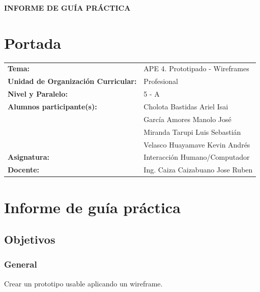\documentclass{article}
\begin{document}
\begin{center}
    {\large \textbf{INFORME DE GUÍA PRÁCTICA}} \\
\end{center}

\section{Portada}
\begin{flushleft}
\begin{tabular}{ l p{9cm} }
    \textbf{Tema:} & APE 4. Prototipado - Wireframes \\
    \textbf{Unidad de Organización Curricular:} & Profesional \\
    \textbf{Nivel y Paralelo:} & 5 - A \\
    \textbf{Alumnos participante(s):} & Cholota Bastidas Ariel Isai \\
                                      & García Amores Manolo José \\
                                      & Miranda Tarupi Luis Sebastián \\
                                      & Velasco Huayamave Kevin Andrés \\
    \textbf{Asignatura:} & Interacción Humano/Computador \\
    \textbf{Docente:} & Ing. Caiza Caizabuano Jose Ruben \\
\end{tabular}
\end{flushleft}

\section{Informe de guía práctica}

\subsection{Objetivos}
\subsubsection{General}
Crear un prototipo usable aplicando un wireframe.
\end{document}
